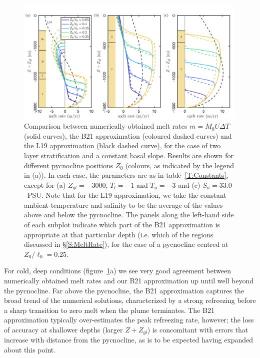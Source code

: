 \documentclass[openacc]{rsproca_new}%
\begin{document}
\begin{figure}
\centering
\includegraphics[width = 0.99\textwidth]{Submitted_PRSA/make_plots/plots/figure7.pdf}
\caption{Comparison between numerically obtained melt rates $\dot{m}= M_0 U \Delta T$ (solid curves), the B21 approximation (coloured dashed curves) and the L19 approximation (black dashed curve), for the case of two layer stratification and a constant basal slope. Results are shown for different pycnocline positions $Z_0$ (colours, as indicated by the legend in (a)). In each case, the parameters are as in table~\ref{T:Constants}, except for (a) $Z_{gl} = -3000$, $T_l = -1$ and $T_u = -3$ and (c)  $S_u = 33.0$~PSU. Note that for the L19 approximation, we take the constant ambient temperature and salinity to be the average of the values above and below the pycnocline. The panels along the left-hand side of each subplot indicate which part of the B21 approximation is appropriate at that particular depth (i.e. which of the regions discussed in \S\ref{S:MeltRate}), for the case of a pycnocline centred at $Z_0/\ell_0 = 0.25$.}\label{fig:Numerics:PycnoclinePosition}
\end{figure}

For cold, deep conditions (figure~\ref{fig:Numerics:PycnoclinePosition}a) we see very good agreement between numerically obtained melt rates and our B21 approximation up until well beyond the pycnocline. Far above the pycnocline, the B21 approximation captures the broad trend of the numerical solutions, characterized by a strong refreezing before a sharp transition to zero melt when the plume terminates. The B21 approximation typically over-estimates the peak refreezing rate, however; the loss of accuracy at shallower depths (larger $Z + Z_{gl}$) is concomitant with errors that increase with distance from the pycnocline, as is to be expected having expanded about this point.
\end{document}
